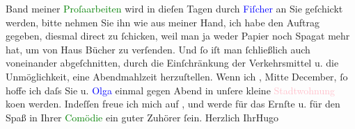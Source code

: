                     Band meiner \textcolor{green}{Proſaarbeiten}{}\ledrightnote{\textcolor{green}{Die prosaischen Schriften}} wird in dieſen Tagen
                    durch \textcolor{blue}{Fiſcher}{}\ledrightnote{\textcolor{blue}{Samuel Fischer}} an Sie geſchickt werden, bitte
                    nehmen Sie ihn wie aus meiner Hand, ich habe den Auftrag gegeben, diesmal direct
                    zu ſchicken, weil man ja weder Papier noch Spagat mehr hat, um von Haus Bücher
                    zu verſenden. Und ſo iſt man ſchließlich auch voneinander abgeſchnitten, durch
                    die Einſchränkung der Verkehrsmittel u. die Unmöglichkeit, eine Abendmahlzeit
                    herzuſtellen.\pend
           \pstart
           Wenn ich \label{K_L02280_3v}\label{K_L02280_3h}, Mitte December,
                    ſo hoffe ich daſs Sie u. \textcolor{blue}{Olga}{}\ledrightnote{\textcolor{blue}{Olga Schnitzler}} einmal gegen
                    Abend in unſere kleine \textcolor{pink}{Stadtwohnung}{} ko{\geminationm}en werden. Indeſſen freue
                    ich mich auf \label{K_L02280_4v}\label{K_L02280_4h}, und werde für das
                    Ernſte u. für den Spaß in Ihrer \textcolor{green}{Comödie}{} ein guter Zuhörer ſein.\pend
           \pstart Herzlich Ihr\spacefill\mbox{Hugo}\pend{}\endnumbering{}  
      